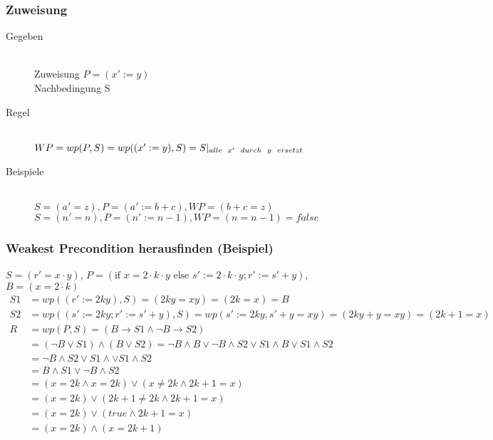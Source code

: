 \documentclass[a4paper,10pt]{article}
\newcommand{\T}[1]{\text{#1}} %
\begin{document}
\subsubsection{Zuweisung}
\begin{description}
	\item[Gegeben] \hfill \\
		Zuweisung $P = (x' := y)$ \\
		Nachbedingung S
	\item[Regel] \hfill \\
		$WP = wp(P, S) = wp((x' := y), S) = S |_{alle \hspace{2mm} x' \hspace{2mm} durch \hspace{2mm} y \hspace{2mm} ersetzt}$
	\item[Beispiele] \hfill \\
		$S = (a' = z), P = (a' := b + c), WP = (b + c = z)$ \\
		$S = (n' = n), P = (n' := n-1), WP = (n = n-1) = false$
\end{description}
\subsubsection{Weakest Precondition herausfinden (Beispiel)}
$S=(r'=x\cdot y)$, $P=(\T{if }x=2\cdot k\cdot y\T{ else }s':=2\cdot k\cdot y;r':=s'+y)$, $B=(x=2\cdot k)$
\begin{align*}
S1&=wp((r':=2ky),S)=(2ky=xy)=(2k=x)=B\\
S2&=wp((s':=2ky;r':=s'+y),S)=wp(s':=2ky,s'+y=xy)=(2ky+y=xy)=(2k+1=x)\\
R&=wp(P,S)=(B\to S1\wedge\neg B\to S2)\\
&=(\neg B\vee S1)\wedge(B\vee S2)=\neg B\wedge B\vee\neg B\wedge S2\vee S1\wedge B\vee S1\wedge S2\\
&=\neg B\wedge S2\vee S1\wedge \vee S1\wedge S2\\
&=B\wedge S1\vee\neg B\wedge S2\\
&=(x=2k\wedge x=2k)\vee(x\neq 2k\wedge 2k+1=x)\\
&=(x=2k)\vee(2k+1\neq 2k\wedge 2k+1=x)\\
&=(x=2k)\vee(true\wedge 2k+1=x)\\
&=(x=2k)\wedge(x=2k+1)
\end{align*}
\end{document}
